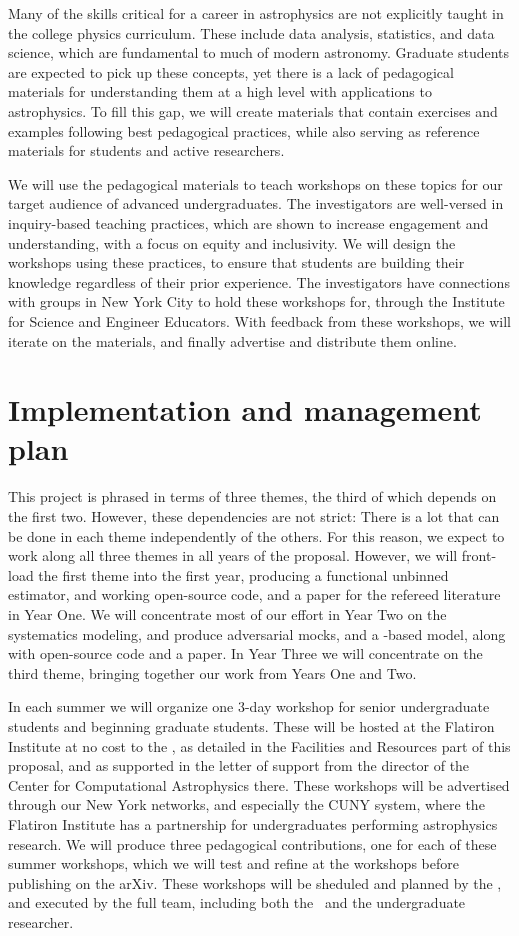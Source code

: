 \documentclass[12pt, fullpage, letterpaper]{article}
\begin{document}
Many of the skills critical for a career in astrophysics are not explicitly taught in the college physics curriculum. 
These include data analysis, statistics, and data science, which are fundamental to much of modern astronomy.
Graduate students are expected to pick up these concepts, yet there is a lack of pedagogical materials for understanding them at a high level with applications to astrophysics.
To fill this gap, we will create materials that contain exercises and examples following best pedagogical practices, while also serving as reference materials for students and active researchers.

We will use the pedagogical materials to teach workshops on these topics for our target audience of advanced undergraduates.
The investigators are well-versed in inquiry-based teaching practices, which are shown to increase engagement and understanding, with a focus on equity and inclusivity.
We will design the workshops using these practices, to ensure that students are building their knowledge regardless of their prior experience.
The investigators have connections with groups in New York City to hold these workshops for, through the Institute for Science and Engineer Educators. 
With feedback from these workshops, we will iterate on the materials, and finally advertise and distribute them online. 

\section{Implementation and management plan}

This project is phrased in terms of three themes, the third of which depends on the
first two.
However, these dependencies are not strict: There is a lot that can be done in each theme
independently of the others.
For this reason, we expect to work along all three themes in all years of the proposal.
However, we will front-load the first theme into the first year, producing a functional
unbinned estimator, and working open-source code, and a paper for the refereed literature in Year One.
We will concentrate most of our effort in Year Two on the systematics modeling, and produce
adversarial mocks, and a \GP-based model, along with open-source code and a paper.
In Year Three we will concentrate on the third theme, bringing together our work from Years One and Two.

In each summer we will organize one 3-day workshop for senior undergraduate students and beginning
graduate students. These will be hosted at the Flatiron Institute at no cost to the \PI, as detailed
in the Facilities and Resources part of this proposal, and as supported in the letter of support from the director of the Center for Computational Astrophysics there.
These workshops will be advertised through our New York networks, and especially the CUNY system, where the Flatiron Institute has a partnership for undergraduates performing astrophysics research.
We will produce three pedagogical contributions, one for each of these summer workshops, which we will test and refine at the workshops before publishing on the arXiv.
These workshops will be sheduled and planned by the \PI, and executed by the full team, including both the \GRA\ and the undergraduate researcher.
\end{document}

